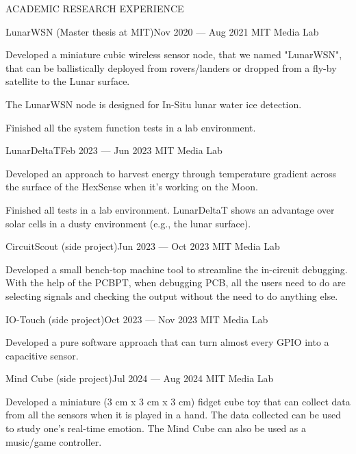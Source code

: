 \documentclass{resume} %
\begin{document}
\begin{rSection}{ACADEMIC RESEARCH EXPERIENCE}
\begin{rSubsection}{LunarWSN (Master thesis at MIT)}{Nov 2020 --- Aug 2021}{ }{MIT Media Lab}
\item Developed a miniature cubic wireless sensor node, that we named "LunarWSN",
      that can be ballistically deployed from rovers/landers or dropped from a fly-by satellite to the Lunar surface.
\item The LunarWSN node is designed for In-Situ lunar water ice detection.
\item Finished all the system function tests in a lab environment.
\end{rSubsection}

\begin{rSubsection}{LunarDeltaT}{Feb 2023 --- Jun 2023}{ }{MIT Media Lab}
\item Developed an approach to harvest energy through temperature gradient across
      the surface of the HexSense when it's working on the Moon.
\item Finished all tests in a lab environment.
      LunarDeltaT shows an advantage over solar cells in a dusty environment (e.g., the lunar surface).
\end{rSubsection}

\begin{rSubsection}{CircuitScout (side project)}{Jun 2023 --- Oct 2023}{ }{MIT Media Lab}
\item Developed a small bench-top machine tool to streamline the in-circuit debugging. With the help of the PCBPT, when debugging PCB,
all the users need to do are selecting signals and checking the output without the need to do anything else.
\end{rSubsection}

\begin{rSubsection}{IO-Touch (side project)}{Oct 2023 --- Nov 2023}{ }{MIT Media Lab}
\item Developed a pure software approach that can turn almost every GPIO into a capacitive sensor.
\end{rSubsection}

\begin{rSubsection}{Mind Cube (side project)}{Jul 2024 --- Aug 2024}{ }{MIT Media Lab}
\item Developed a miniature (3 cm x 3 cm x 3 cm) fidget cube toy that can collect data from all the sensors when it is
played in a hand. The data collected can be used to study one's real-time emotion.
The Mind Cube can also be used as a music/game controller.
\end{rSubsection}

\end{rSection}
\end{document}
